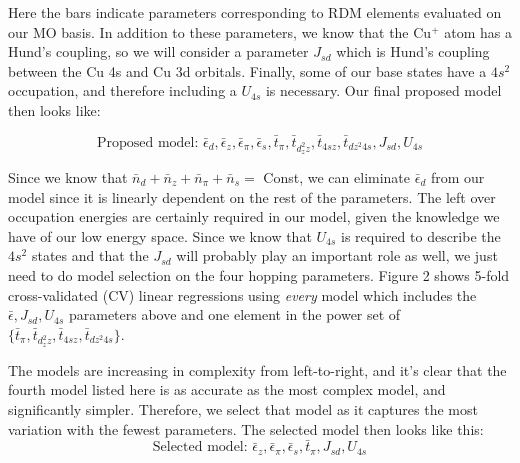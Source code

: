 \documentclass{article}
\begin{document}
Here the bars indicate parameters corresponding to RDM elements evaluated on our MO basis. In addition to these parameters, we know that the Cu$^+$ atom has a Hund's coupling, so we will consider a parameter $J_{sd}$ which is Hund's coupling between the Cu 4s and Cu 3d orbitals. Finally, some of our base states have a $4s^2$ occupation, and therefore including a $U_{4s}$ is necessary. Our final proposed model then looks like: 

$$ \boxed{\text{Proposed model: }\bar{\epsilon}_d, \bar{\epsilon}_z, \bar{\epsilon}_\pi, \bar{\epsilon}_s, \bar{t}_\pi, \bar{t}_{d_z^2 z}, \bar{t}_{4s z}, \bar{t}_{dz^2 4s}, J_{sd}, U_{4s}}$$

Since we know that $\bar{n}_d + \bar{n}_z + \bar{n}_\pi + \bar{n}_s = $ Const, we can eliminate $\bar{\epsilon}_d$ from our model since it is linearly dependent on the rest of the parameters. The left over occupation energies are certainly required in our model, given the knowledge we have of our low energy space. Since we know that $U_{4s}$ is required to describe the $4s^2$ states and that the $J_{sd}$ will probably play an important role as well, we just need to do model selection on the four hopping parameters. Figure 2 shows 5-fold cross-validated (CV) linear regressions using \textit{every} model which includes the $\bar{\epsilon}, J_{sd}, U_{4s}$ parameters above and one element in the power set of $\{\bar{t}_\pi, \bar{t}_{d_z^2 z}, \bar{t}_{4s z}, \bar{t}_{dz^2 4s}\}$. 

The models are increasing in complexity from left-to-right, and it's clear that the fourth model listed here is as accurate as the most complex model, and significantly simpler. Therefore, we select that model as it captures the most variation with the fewest parameters. The selected model then looks like this: 
$$ \boxed{\text{Selected model: }\bar{\epsilon}_z, \bar{\epsilon}_\pi, \bar{\epsilon}_s, \bar{t}_\pi, J_{sd}, U_{4s}}$$
\end{document}
